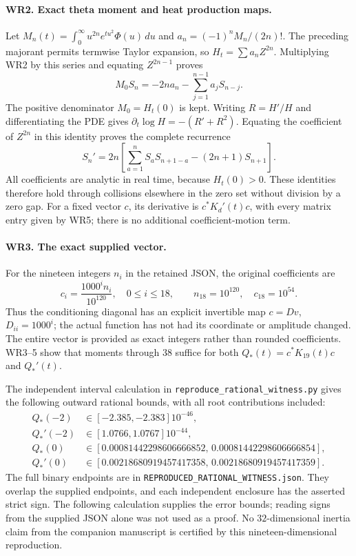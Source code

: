 \documentclass[11pt,a4paper]{article}
\theoremstyle{definition}\newtheorem{definition}[theorem]{Definition}
\begin{document}
\paragraph{WR2. Exact theta moment and heat production maps.}
Let $M_n(t)=\int_0^\infty u^{2n}e^{tu^2}\Phi(u)\,du$ and
$a_n=(-1)^nM_n/(2n)!$. The preceding majorant permits termwise
Taylor expansion, so $H_t=\sum a_nZ^{2n}$. Multiplying WR2 by
this series and equating $Z^{2n-1}$ proves
\[
 M_0S_n=-2n a_n-\sum_{j=1}^{n-1}a_jS_{n-j}.
 \tag{WR4}
\]
The positive denominator $M_0=H_t(0)$ is kept. Writing
$R=H'/H$ and differentiating the PDE gives
$\partial_t\log H=-(R'+R^2)$. Equating the coefficient of
$Z^{2n}$ in this identity proves the complete recurrence
\[
 S_n'=2n\left[\sum_{a=1}^nS_aS_{n+1-a}-(2n+1)S_{n+1}\right].
 \tag{WR5}
\]
All coefficients are analytic in real time, because $H_t(0)>0$.
These identities therefore hold through collisions elsewhere in
the zero set without division by a zero gap. For a fixed vector
$c$, its derivative is $c^*K_d'(t)c$, with every matrix entry
given by WR5; there is no additional coefficient-motion term.

\paragraph{WR3. The exact supplied vector.}
For the nineteen integers $n_i$ in the retained JSON, the original
coefficients are
\[
 c_i=\frac{1000^i n_i}{10^{120}},\quad0\le i\le18,
 \qquad n_{18}=10^{120},\quad c_{18}=10^{54}.
 \tag{WR6}
\]
Thus the conditioning diagonal has an explicit invertible map
$c=Dv$, $D_{ii}=1000^i$; the actual function has not had its
coordinate or amplitude changed. The entire vector is provided
as exact integers rather than rounded coefficients. WR3--5 show
that moments through $38$ suffice for both $Q_*(t)=c^*K_{19}(t)c$
and $Q_*'(t)$.

The independent interval calculation in
\texttt{reproduce\_rational\_witness.py} gives the following outward
rational bounds, with all root contributions included:
\[
\begin{aligned}
Q_*(-2)&\in[-2.385,-2.383]10^{-46},\\
Q_*'(-2)&\in[1.0766,1.0767]10^{-44},\\
Q_*(0)&\in[0.00081442298606666852,\,0.00081442298606666854],\\
Q_*'(0)&\in[0.00218680919457417358,\,0.00218680919457417359].
\end{aligned}\tag{WR7}
\]
The full binary endpoints are in
\texttt{REPRODUCED\_RATIONAL\_WITNESS.json}. They overlap the
supplied endpoints, and each independent enclosure has the asserted
strict sign. The following calculation supplies the error bounds;
reading signs from the supplied JSON alone was not used as a proof.
No $32$-dimensional inertia claim from the companion manuscript is
certified by this nineteen-dimensional reproduction.
\end{document}
